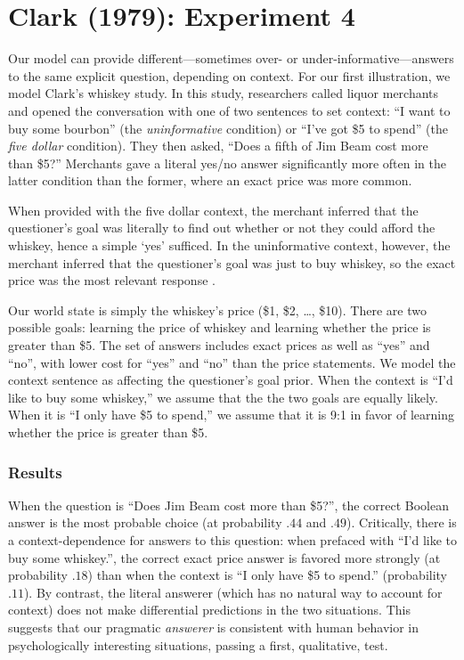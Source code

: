 \documentclass[10pt,letterpaper]{article}
\begin{document}
\section{Clark (1979): Experiment 4}

Our model can provide different---sometimes over- or under-informative---answers to the same explicit question, depending on context. For our first illustration, we model Clark's \citeyear{Clark79_IndirectSpeechActs} whiskey study. In this study, researchers called liquor merchants and opened the conversation with one of two sentences to set context: ``I want to buy some bourbon'' (the \emph{uninformative} condition) or ``I've got \$5 to spend'' (the \emph{five dollar} condition). They then asked, ``Does a fifth of Jim Beam cost more than \$5?'' Merchants gave a literal yes/no answer significantly more often in the latter condition than the former, where an exact price was more common. 

When provided with the five dollar context, the merchant inferred that the questioner's goal was literally to find out whether or not they could afford the whiskey, hence a simple `yes'  sufficed. In the uninformative context, however, the merchant inferred that the questioner's goal was just to buy whiskey, so the exact price was the most relevant response \cite{Clark79_IndirectSpeechActs}. 

Our world state is simply the whiskey's price (\$1, \$2, \dots, \$10). There are two possible goals: learning the price of whiskey and learning whether the price is greater than \$5. The set of answers includes exact prices as well as ``yes'' and ``no'', with lower cost for ``yes'' and ``no'' than the price statements. We model the context sentence as affecting the questioner's goal prior. When the context is ``I'd like to buy some whiskey,'' we assume that the the two goals are equally likely. When it is ``I only have \$5 to spend,'' we assume that it is 9:1 in favor of learning whether the price is greater than \$5.

\subsubsection{Results} When the question is ``Does Jim Beam cost more than \$5?'', the correct Boolean answer is  the most probable choice (at probability $.44$ and $.49$). Critically, there is a context-dependence for answers to this question: when prefaced with ``I'd like to buy some whiskey.'', the correct exact price answer is favored more strongly (at probability $.18$) than when the context is ``I only have \$5 to spend.'' (probability $.11$). By contrast, the literal answerer (which has no natural way to account for context) does not make differential predictions in the two situations. This suggests that our pragmatic \emph{answerer} is consistent with human behavior in psychologically interesting situations, passing a first, qualitative, test. 
\end{document}
